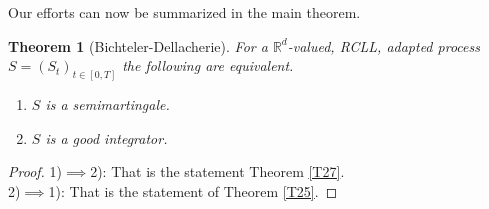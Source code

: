 \documentclass[12pt,a4paper, twoside]{article}
\newtheorem{thm}{Theorem}[section]
\theoremstyle{definition}
\begin{document}
Our efforts can now be summarized in the main theorem.
\begin{mdframed}[backgroundcolor=yellow!20, topline=true, linewidth=2.0pt]
\begin{thm}[Bichteler-Dellacherie] For a $\mathbb{R}^d$-valued, RCLL, adapted process $S=(S_t)_{t \in [0,T]}$ the following are equivalent.
\begin{enumerate}
\item $S$ is a semimartingale.
\item $S$ is a good integrator.
\end{enumerate}
\end{thm}
\end{mdframed}
\begin{proof}
1)$\implies$2): That is the statement Theorem \ref{T27}. 
\\
2)$\implies$1): That is the statement of Theorem \ref{T25}.
\end{proof}
\newpage
\end{document}
